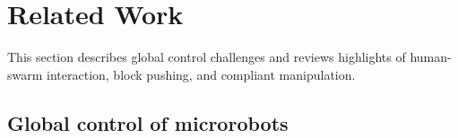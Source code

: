 

\section{Related Work}\label{sec:RelatedWork}
This section describes global control challenges and reviews highlights of human-swarm interaction, block pushing, and compliant manipulation.


\subsection{Global control of microrobots}

